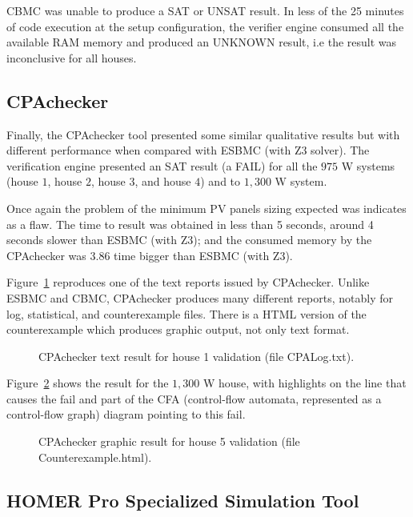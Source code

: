 CBMC was unable to produce a SAT or UNSAT result. In less of the 25 minutes of code execution at the setup configuration, the verifier engine consumed all the available RAM memory and produced an UNKNOWN result, i.e the result was inconclusive for all houses. 


\subsection{CPAchecker}

Finally, the CPAchecker tool presented some similar qualitative results but with different performance when compared with ESBMC (with Z3 solver). The verification engine presented an SAT result (a FAIL) for all the $975$ W systems (house $1$, house $2$, house $3$, and house $4$) and to $1,300$ W system.

Once again the problem of the minimum PV panels sizing expected was indicates as a flaw. The time to result was obtained in less than 5 seconds, around 4 seconds slower than ESBMC (with Z3); and the consumed memory by the CPAchecker was $3.86$ time bigger than ESBMC (with Z3).

Figure~\ref{fig:cpavalidh1} reproduces one of the text reports issued by CPAchecker. Unlike ESBMC and CBMC, CPAchecker produces many different reports, notably for log, statistical, and counterexample files. There is a HTML version of the counterexample which produces graphic output, not only text format.

\begin{figure}[h]
\centering
\caption{CPAchecker text result for house 1 validation (file CPALog.txt).}
\label{fig:cpavalidh1}
\end{figure}

Figure~\ref{fig:cpavalidh5} shows the result for the $1,300$ W house, with highlights on the line that causes the fail and part of the CFA (control-flow automata, represented as a control-flow graph) diagram pointing to this fail.

\begin{figure}[h]
\centering
\caption{CPAchecker graphic result for house 5 validation (file Counterexample.html).}
\label{fig:cpavalidh5}
\end{figure}


\subsection{HOMER Pro Specialized Simulation Tool}
\label{sec:homerenviron}

